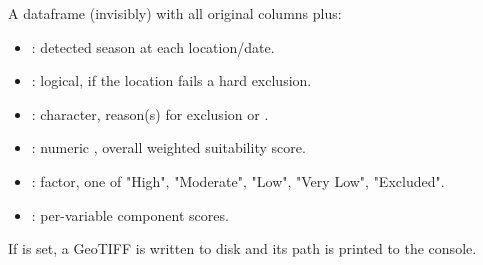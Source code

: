 \documentclass[a4paper]{book}
\begin{document}
\begin{Value}
A dataframe (invisibly) with all original columns plus:
\begin{itemize}

\item{} : detected season at each location/date.
\item{} : logical,  if the location fails a hard exclusion.
\item{} : character, reason(s) for exclusion or .
\item{} : numeric , overall weighted suitability score.
\item{} : factor, one of "High", "Moderate", "Low",
"Very Low", "Excluded".
\item{} : per-variable component scores.

\end{itemize}


If  is set, a GeoTIFF is written to disk and its path is
printed to the console.
\end{Value}
%
\end{document}
